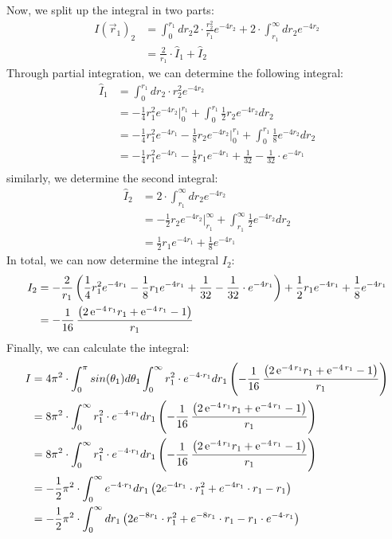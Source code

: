 \documentclass[10pt,a4paper]{article}
\begin{document}
Now, we split up the integral in two parts:
\begin{align}
I(\vec{r}_1)_2&=\int_{0}^{r_1} dr_2 2 \cdot \frac{r_2^2}{r_1} e^{-4 r_2} + 2 \cdot\int_{r_1}^{\infty} dr_2 e^{-4r_2}\\
&= \frac{2}{r_1} \cdot \hat{I}_1 +  \hat{I}_2
\end{align}
Through partial integration, we can determine the following integral:
\begin{align}
\hat{I}_1&=\int_{0}^{r_1} dr_2 \cdot r_2^2 e^{-4 r_2}\\
&= -\frac{1}{4} r_1^2 e^{-4r_2}|_0^{r_1} +\int_0^{r_1} \frac{1}{2} r_2 e^{-4 r_2}dr_2\\
&=-\frac{1}{4}r_1^2 e^{-4 r_1}-\frac{1}{8}r_2 e^{-4r_2} |_0^{r_1} + \int_0^{r_1} \frac{1}{8} e^{-4 r_2} dr_2\\
&=-\frac{1}{4}r_1^2 e^{-4 r_1}-\frac{1}{8}r_1 e^{-4r_1} + \frac{1}{32}-\frac{1}{32} \cdot e^{-4 r_1}\\
\end{align}
similarly, we determine the second integral:
\begin{align}
\hat{I}_2 &= 2 \cdot\int_{r_1}^{\infty} dr_2 e^{-4r_2}\\
&= -\frac{1}{2} r_2 e^{-4 r_2} |_{r_1}^{\infty} + \int_{r_1}^{\infty} \frac{1}{2} e^{-4 r_2} dr_2 \\
&=\frac{1}{2} r_1 e^{-4 r_1} + \frac{1}{8} e^{-4 r_1} 
\end{align}
In total, we can now determine the integral $I_2$:
\begin{align}
I_2 &= - \frac{2}{r_1}\left(\frac{1}{4}r_1^2 e^{-4 r_1}-\frac{1}{8}r_1 e^{-4r_1} + \frac{1}{32}-\frac{1}{32} \cdot e^{-4 r_1}\right) + \frac{1}{2} r_1 e^{-4 r_1} + \frac{1}{8} e^{-4 r_1} \\
&= -\frac{1}{16}\,{\frac { \left( 2\,{{\rm e}^{-
4\,r_1}}r_1+{{\rm e}^{-4\,r_1}}-1 \right) }{r_1}}
\end{align}
Finally, we can calculate the integral:
\begin{align}
I&= 4 \pi^2 \cdot \int_{0}^{ \pi} sin(\theta_1) d\theta_1 \int_{0}^{\infty}  r_1^2 \cdot e^{-4 \cdot r_1} dr_1 \left( -\frac{1}{16}\,{\frac { \left( 2\,{{\rm e}^{-
4\,r_1}}r_1+{{\rm e}^{-4\,r_1}}-1 \right) }{r_1}} \right)\\
&= 8 \pi^2 \cdot \int_{0}^{\infty}  r_1^2 \cdot e^{-4 \cdot r_1} dr_1 \left( -\frac{1}{16}\,{\frac { \left( 2\,{{\rm e}^{-
4\,r_1}}r_1+{{\rm e}^{-4\,r_1}}-1 \right) }{r_1}}\right)\\
&= 8 \pi^2 \cdot \int_{0}^{\infty}  r_1^2 \cdot e^{-4 \cdot r_1} dr_1 \left( -\frac{1}{16}\,{\frac { \left( 2\,{{\rm e}^{-
4\,r_1}}r_1+{{\rm e}^{-4\,r_1}}-1 \right) }{r_1}} \right)\\
&=-\frac{1}{2}\pi^2 \cdot \int_0^{\infty} e^{-4 \cdot r_1} dr_1 \left( 2 e^{-4r_1} \cdot r_1^2 + e^{-4r_1} \cdot r_1 - r_1 \right)\\
&=-\frac{1}{2}\pi^2 \cdot \int_0^{\infty}  dr_1 \left( 2 e^{-8r_1} \cdot r_1^2 + e^{-8r_1} \cdot r_1 - r_1 \cdot e^{-4 \cdot r_1} \right)\\
\end{align}
\end{document}
